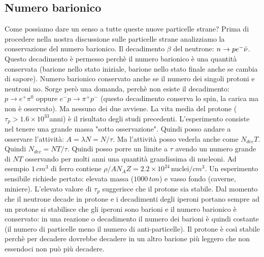 \subsection{Numero barionico}
Come possiamo dare un senso a tutte queste nuove particelle strane? Prima di procedere nella nostra discussione sulle particelle strane analizziamo la conservazione del numero barionico. Il decadimento $\beta$ del neutrone: $n\to pe^-\Bar{\nu}$. Questo decadimento è permesso perchè il numero barionico è una quantità conservata (barione nello stato iniziale, barione nello stato finale anche se cambia di sapore). Numero barionico conservato anche se il numero dei singoli protoni e neutroni no. Sorge però una domanda, perchè non esiste il decadimento: $p\to e^+\pi^0$ oppure $e^-p\to \pi^+p^-$ (questo decadimento conserva lo spin, la carica ma non è osservato). Ma nessuno dei due avviene. La vita media del protone ($\tau_p>1.6\times10^{33}$anni) è il risultato degli studi precedenti. L'esperimento consiste nel tenere una grande massa "sotto osservazione". Quindi posso andare a osservare l'attività: $A=\lambda N=N/\tau$. Ma l'attività posso vederla anche come $N_{dec}T$. Quindi $N_{dec}=NT/\tau$. Quindi posso porre un limite a $\tau$ avendo un numero grande di $NT$ osservando per molti anni una quantità grandissima di nucleoni. Ad esempio $1\,cm^3$ di ferro contiene $\rho/AN_AZ=2.2\times10^{24}\,$nuclei$/cm^3$. Un esperimento sensibile richiede pertato: elevata massa ($1000\,ton$) e vasso fondo (caverne, miniere). L'elevato valore di $\tau_p$ suggerisce che il protone sia stabile. Dal momento che il neutrone decade in protone e i decadimenti degli iperoni portano sempre ad un protone si stabilisce che gli iperoni sono barioni e il numero barionico è conservato: in una reazione o decadimento il numero dei barioni è quindi costante (il numero di particelle meno il numero di anti-particelle). Il protone è così stabile perchè per decadere dovrebbe decadere in un altro barione più leggero che non essendoci non può più decadere.
